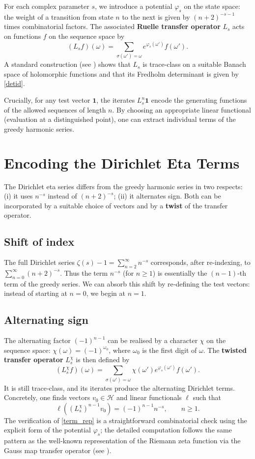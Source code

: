 \documentclass[11pt,a4paper]{article}
\begin{document}
For each complex parameter $s$, we introduce a potential $\varphi_s$ on the state space: the weight of a transition from state $n$ to the next is given by $(n+2)^{-s-1}$ times combinatorial factors.  The associated \textbf{Ruelle transfer operator} $L_s$ acts on functions $f$ on the sequence space by
\[
(L_s f)(\omega) = \sum_{\sigma(\omega') = \omega} e^{\varphi_s(\omega')} f(\omega').
\]
A standard construction (see \cite{Mayer, HST}) shows that $L_s$ is trace‑class on a suitable Banach space of holomorphic functions and that its Fredholm determinant is given by \eqref{detid}.

Crucially, for any test vector $\mathbf{1}$, the iterates $L_s^n\mathbf{1}$ encode the generating functions of the allowed sequences of length $n$.  By choosing an appropriate linear functional (evaluation at a distinguished point), one can extract individual terms of the greedy harmonic series.

\section{Encoding the Dirichlet Eta Terms}
The Dirichlet eta series differs from the greedy harmonic series in two respects: (i) it uses $n^{-s}$ instead of $(n+2)^{-s}$; (ii) it alternates sign.  Both can be incorporated by a suitable choice of vectors and by a \textbf{twist} of the transfer operator.

\subsection{Shift of index}
The full Dirichlet series $\zeta(s)-1 = \sum_{n=2}^{\infty} n^{-s}$ corresponds, after re‑indexing, to $\sum_{n=0}^{\infty} (n+2)^{-s}$.  Thus the term $n^{-s}$ (for $n\ge 1$) is essentially the $(n-1)$-th term of the greedy series.  We can absorb this shift by re‑defining the test vectors: instead of starting at $n=0$, we begin at $n=1$.

\subsection{Alternating sign}
The alternating factor $(-1)^{n-1}$ can be realised by a character $\chi$ on the sequence space: $\chi(\omega)=(-1)^{\omega_0}$, where $\omega_0$ is the first digit of $\omega$.  The \textbf{twisted transfer operator} $L_s^{\chi}$ is then defined by
\[
(L_s^{\chi} f)(\omega) = \sum_{\sigma(\omega') = \omega} \chi(\omega') e^{\varphi_s(\omega')} f(\omega').
\]
It is still trace‑class, and its iterates produce the alternating Dirichlet terms.  Concretely, one finds vectors $v_0\in\mathcal{H}$ and linear functionals $\ell$ such that
\[
\ell( (L_s^{\chi})^{n-1} v_0 ) = (-1)^{n-1} n^{-s}, \qquad n\ge 1.
\tag{2}
\]
The verification of \eqref{term_rep} is a straightforward combinatorial check using the explicit form of the potential $\varphi_s$; the detailed computation follows the same pattern as the well‑known representation of the Riemann zeta function via the Gauss map transfer operator (see \cite{Mayer, Efrat}).
\end{document}
